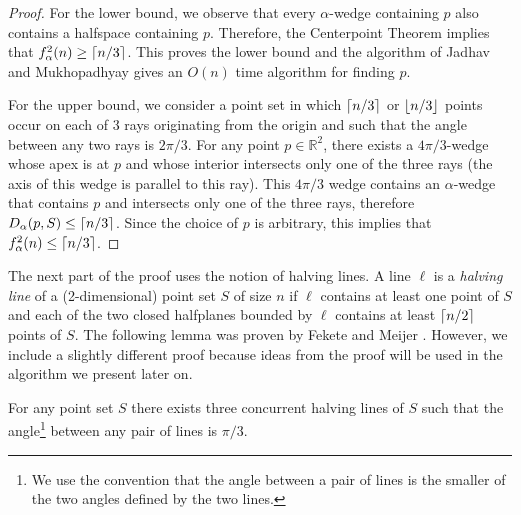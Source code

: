 \documentclass[lotsofwhite]{patmorin}
\begin{document}
\begin{proof} 
For the lower bound, we observe that every $\alpha$-wedge containing
$p$ also contains a halfspace containing $p$.  Therefore, the
Centerpoint Theorem implies that $f^2_\alpha(n) \ge \left\lceil n/3 \right\rceil$.  This
proves the lower bound and the algorithm of Jadhav and Mukhopadhyay
\cite{jm94} gives an $O(n)$ time algorithm for finding $p$.

For the upper bound, we consider a point set in which $\left\lceil n/3 \right\rceil$ or
$\left\lfloor n/3 \right\rfloor$ points occur on each of 3 rays originating from the
origin and such that the angle between any two rays is $2\pi/3$.  For
any point $p\in\mathbb{R}^2$, there exists a $4\pi/3$-wedge whose apex
is at $p$ and whose interior intersects only one of the three rays
(the axis of this wedge is parallel to this ray). This $4\pi/3$ wedge
contains an $\alpha$-wedge that contains $p$ and intersects only one
of the three rays, therefore $D_\alpha(p,S)\le \left\lceil n/3 \right\rceil$.  Since the choice
of $p$ is arbitrary, this implies that $f^2_\alpha(n) \le \left\lceil n/3 \right\rceil$.
\end{proof}

The next part of the proof uses the notion of halving lines.  A line
$\ell$ is a \emph{halving line} of a (2-dimensional) point set $S$ of
size $n$ if $\ell$ contains at least one point of $S$ and each of the
two closed halfplanes bounded by $\ell$ contains at least $\left\lceil n/2 \right\rceil$
points of $S$.  The following lemma was proven by Fekete and Meijer
\cite[Lemma~2]{fm00}.  However, we include a slightly different proof
because ideas from the proof will be used in the algorithm we present
later on.

\begin{lem}
For any point set $S$ there exists three concurrent halving lines 
of $S$ such that the angle\footnote{We use the convention that
the angle between a pair of lines is the smaller of the two angles
defined by the two lines.} between any pair of lines is $\pi/3$.
\end{lem}
\end{document}
